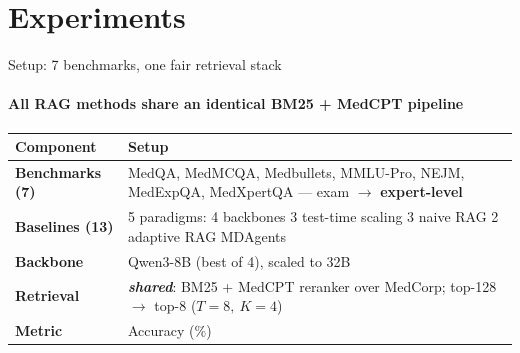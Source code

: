 \documentclass[10pt, aspectratio=169, t]{beamer}   %
\newcommand{\good}[1]{{\color{posblue}\bfseries #1}}  %
\begin{document}
\section{Experiments}

\begin{frame}{Setup: 7 benchmarks, one fair retrieval stack}
  \framesubtitle{All RAG methods share an identical BM25 + MedCPT pipeline}
  \vfill
  \renewcommand{\arraystretch}{1.55}
  \setlength{\tabcolsep}{5pt}
  \begin{center}
  \begin{tabular}{@{}>{\bfseries}l p{}@{}}
    \toprule
    \normalfont\textbf{Component} & \textbf{Setup}\\
    \midrule
    Benchmarks (7) & MedQA, MedMCQA, Medbullets, MMLU-Pro, NEJM, MedExpQA, MedXpertQA — exam $\to$ \good{expert-level}\\
    Baselines (13) & 5 paradigms: 4 backbones \textperiodcentered{} 3 test-time scaling \textperiodcentered{} 3 naive RAG \textperiodcentered{} 2 adaptive RAG \textperiodcentered{} MDAgents\\
    Backbone & Qwen3-8B (best of 4), scaled to 32B\\
    Retrieval & \good{\emph{shared}}: BM25 + MedCPT reranker over MedCorp; top-128 $\to$ top-8 \;($T{=}8,\ K{=}4$)\\
    Metric & Accuracy (\%)\\
    \bottomrule
  \end{tabular}
  \end{center}
  \vfill
\end{frame}
\end{document}
